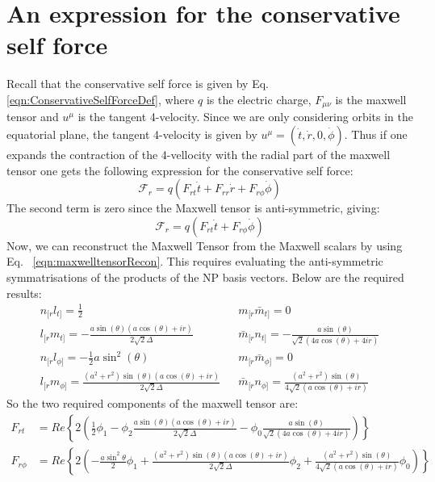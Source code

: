\documentclass[preprint,showpacs,preprintnumbers,amssymb,superscriptaddress,aps,prd,nofootinbib,11pt]{revtex4-1}
\begin{document}
\section{An expression for the conservative self force}
Recall that the conservative self force is given by Eq. \eqref{eqn:ConservativeSelfForceDef}, where $q$ is the electric charge, $F_{\mu\nu}$ is the maxwell tensor and $u^\mu$ is the tangent 4-velocity. Since we are only considering orbits in the equatorial plane, the tangent 4-velocity is given by $u^\mu = (\dot{t}, \dot{r}, 0 , \dot{\phi})$. Thus if one expands the contraction of the 4-vellocity with the radial part of the  maxwell tensor one gets the following expression for the conservative self force:
\begin{equation}
    \mathcal{F}_r = q (F_{rt} \dot{t} + F_{rr} \dot{r} + F_{r\phi} \dot{\phi})
\end{equation}
The second term is zero since the Maxwell tensor is anti-symmetric, giving:
\begin{equation}
    \mathcal{F}_r = q (F_{rt} \dot{t} + F_{r\phi} \dot{\phi})
\end{equation}
Now, we can reconstruct the Maxwell Tensor from the Maxwell scalars by using Eq.~ \eqref{eqn:maxwelltensorRecon}. This requires evaluating the anti-symmetric symmatrisations of the products of the NP basis vectors. Below are the required results:
\begin{align}
    n_{[r}l_{t]} = \frac{1}{2}&&m_{[r}\bar{m}_{t]} = 0\\
    l_{[r}m_{t]} = -\frac{a \sin (\theta ) (a \cos (\theta )+i r)}{2 \sqrt{2}\Delta} && \bar{m}_{[r}n_{t]} = -\frac{a \sin (\theta )}{\sqrt{2} (4 a \cos (\theta )+4 i r)}\\
    n_{[r}l_{\phi ]} = -\frac{1}{2} a \sin ^2(\theta ) && m_{[r} \bar{m}_{\phi]} = 0 \\
    l_{[r}m_{\phi]}= \frac{\left(a^2+r^2\right) \sin (\theta ) (a \cos (\theta )+i r)}{2 \sqrt{2} \Delta} && \bar{m}_{[r}n_{\phi ]} = \frac{\left(a^2+r^2\right) \sin (\theta )}{4 \sqrt{2} (a \cos (\theta )+i r)}
\end{align}
So the two required components of the maxwell tensor are:
\begin{align}
    F_{rt} &=Re \left\{ 2 \left( \frac{1}{2}\phi_1 - \phi_2  \frac{a \sin (\theta ) (a \cos (\theta )+i r)}{2 \sqrt{2}\Delta} - \phi_0 \frac{a \sin (\theta )}{\sqrt{2} (4 a \cos (\theta )+4 i r)}\right)\right \}\\
    F_{r\phi} &= Re\left\{2 \left( - \frac{a \sin^2\theta}{2} \phi_1 +\frac{\left(a^2+r^2\right) \sin (\theta ) (a \cos (\theta )+i r)}{2 \sqrt{2} \Delta} \phi_2  +  \frac{\left(a^2+r^2\right) \sin (\theta )}{4 \sqrt{2} (a \cos (\theta )+i r)} \phi_0\right)\right\}
\end{align}
\end{document}
